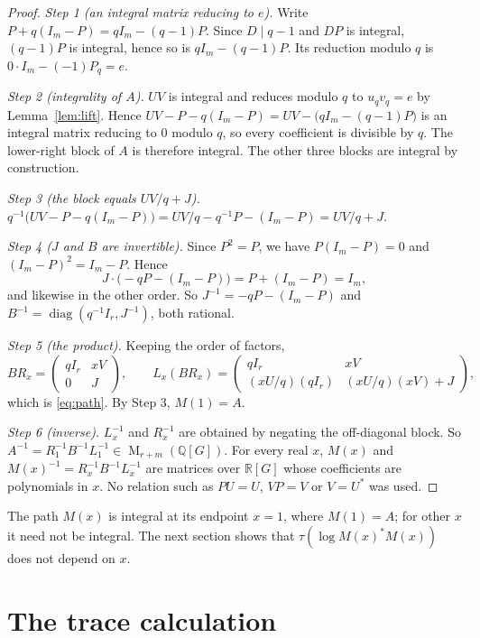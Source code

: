 \documentclass[11pt]{article}
\theoremstyle{remark}
\numberwithin{equation}{section}
\newcommand{\Q}{\mathbb Q}
\newcommand{\R}{\mathbb R}
\newcommand{\Mat}{\operatorname{M}}
\newcommand{\diag}{\operatorname{diag}}
\begin{document}
\begin{proof}
\emph{Step 1 (an integral matrix reducing to $e$).} Write $P+q(I_m-P)=qI_m-(q-1)P$. Since $D\mid q-1$ and $DP$ is integral, $(q-1)P$ is integral, hence so is $qI_m-(q-1)P$. Its reduction modulo $q$ is $0\cdot I_m-(-1)P_q=e$.

\emph{Step 2 (integrality of $A$).} $UV$ is integral and reduces modulo $q$ to $u_qv_q=e$ by Lemma~\ref{lem:lift}. Hence $UV-P-q(I_m-P)=UV-\bigl(qI_m-(q-1)P\bigr)$ is an integral matrix reducing to $0$ modulo $q$, so every coefficient is divisible by $q$. The lower-right block of $A$ is therefore integral. The other three blocks are integral by construction.

\emph{Step 3 (the block equals $UV/q+J$).} $q^{-1}\bigl(UV-P-q(I_m-P)\bigr)=UV/q-q^{-1}P-(I_m-P)=UV/q+J$.

\emph{Step 4 ($J$ and $B$ are invertible).} Since $P^2=P$, we have $P(I_m-P)=0$ and $(I_m-P)^2=I_m-P$. Hence
\[
 J\cdot\bigl(-qP-(I_m-P)\bigr)=P+(I_m-P)=I_m,
\]
and likewise in the other order. So $J^{-1}=-qP-(I_m-P)$ and $B^{-1}=\diag(q^{-1}I_r,J^{-1})$, both rational.

\emph{Step 5 (the product).} Keeping the order of factors,
\[
 BR_x=\begin{pmatrix}qI_r&xV\\0&J\end{pmatrix},\qquad
 L_x(BR_x)=\begin{pmatrix}qI_r&xV\\ (xU/q)(qI_r)&(xU/q)(xV)+J\end{pmatrix},
\]
which is \eqref{eq:path}. By Step 3, $M(1)=A$.

\emph{Step 6 (inverse).} $L_x^{-1}$ and $R_x^{-1}$ are obtained by negating the off-diagonal block. So $A^{-1}=R_1^{-1}B^{-1}L_1^{-1}\in\Mat_{r+m}(\Q[G])$. For every real $x$, $M(x)$ and $M(x)^{-1}=R_x^{-1}B^{-1}L_x^{-1}$ are matrices over $\R[G]$ whose coefficients are polynomials in $x$. No relation such as $PU=U$, $VP=V$ or $V=U^*$ was used.
\end{proof}

The path $M(x)$ is integral at its endpoint $x=1$, where $M(1)=A$; for other $x$ it need not be integral. The next section shows that $\tau(\log M(x)^*M(x))$ does not depend on $x$.

\section{The trace calculation}
\label{sec:analysis}
\end{document}
